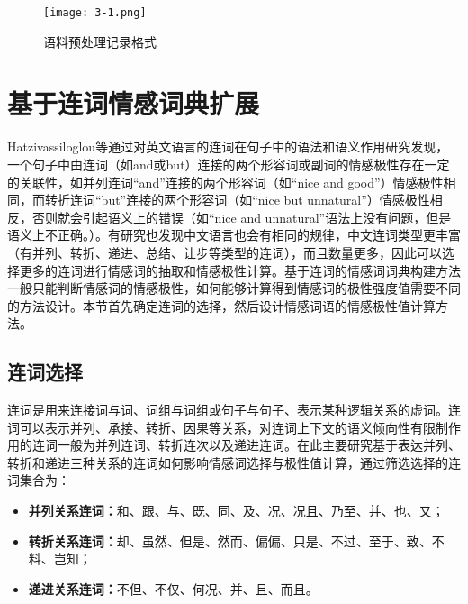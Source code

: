 \begin{figure}[htp]
\centering
\texttt{[image: 3-1.png]}
\caption{语料预处理记录格式}
\label{fig3-1}
\end{figure}

\section{基于连词情感词典扩展}
\label{linkage}
Hatzivassiloglou等通过对英文语言的连词在句子中的语法和语义作用研究发现，一个句子中由连词（如and或but）连接的两个形容词或副词的情感极性存在一定的关联性，如并列连词“and”连接的两个形容词（如“nice and good”）情感极性相同，而转折连词“but”连接的两个形容词（如“nice but unnatural”）情感极性相反，否则就会引起语义上的错误（如“nice and unnatural”语法上没有问题，但是语义上不正确。）。有研究也发现中文语言也会有相同的规律，中文连词类型更丰富（有并列、转折、递进、总结、让步等类型的连词），而且数量更多，因此可以选择更多的连词进行情感词的抽取和情感极性计算。基于连词的情感词词典构建方法一般只能判断情感词的情感极性，如何能够计算得到情感词的极性强度值需要不同的方法设计。本节首先确定连词的选择，然后设计情感词语的情感极性值计算方法。

\subsection{连词选择}
连词是用来连接词与词、词组与词组或句子与句子、表示某种逻辑关系的虚词。连词可以表示并列、承接、转折、因果等关系，对连词上下文的语义倾向性有限制作用的连词一般为并列连词、转折连次以及递进连词。在此主要研究基于表达并列、转折和递进三种关系的连词如何影响情感词选择与极性值计算，通过筛选选择的连词集合为：
\begin{itemize}
\item \textbf{并列关系连词：}和、跟、与、既、同、及、况、况且、乃至、并、也、又；
\item \textbf{转折关系连词：}却、虽然、但是、然而、偏偏、只是、不过、至于、致、不料、岂知；
\item \textbf{递进关系连词：}不但、不仅、何况、并、且、而且。
\end{itemize}

